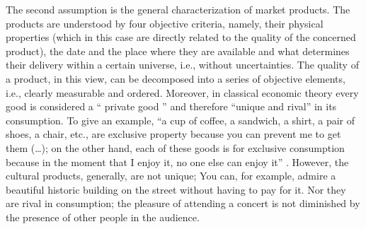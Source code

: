 \documentclass[a4paper, 12pt, openright, oneside, german, french, brazil, english, article]{abntex2}
\begin{document}
	
	
	The second assumption is the general characterization of market products. The products are understood by four objective criteria, namely, their physical properties (which in this case are directly related to the quality of the concerned product), the date and the place where they are available and what determines their delivery within a certain universe, i.e., without uncertainties. The quality of a product, in this view, can be decomposed into a series of objective elements, i.e., clearly measurable and ordered. Moreover, in classical economic theory every good is considered a `` private good '' and therefore ``unique and rival'' in its consumption. To give an example, ``a cup of coffee, a sandwich, a shirt, a pair of shoes, a chair, etc., are exclusive property because you can prevent me to get them (\ldots); on the other hand, each of these goods is for exclusive consumption because in the moment that I enjoy it, no one else can enjoy it'' \cite[p. 29]{tolila2007cultura}. However, the cultural products, generally, are not unique; You can, for example, admire a beautiful historic building on the street without having to pay for it. Nor they are rival in consumption; the pleasure of attending a concert is not diminished by the presence of other people in the audience.
	
\end{document}
